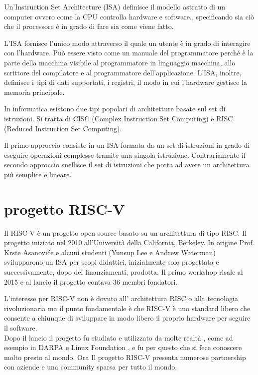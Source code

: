 \documentclass[12pt,a4paper]{report}
\begin{document}
Un'Instruction Set Architecture (ISA) definisce il modello astratto di un computer ovvero come la CPU controlla hardware e software., specificando sia ciò che il processore è in grado di fare sia come viene fatto.

L'ISA fornisce l'unico modo attraverso il quale un utente è in grado di interagire con l'hardware. Può essere visto come un manuale del programmatore perché è la parte della macchina visibile al programmatore in linguaggio macchina,  allo scrittore del compilatore e al programmatore dell'applicazione.
L'ISA, inoltre, definisce i tipi di dati supportati, i registri, il modo in cui l'hardware gestisce la memoria principale. 

In informatica esistono due tipi popolari di architetture basate sul set di istruzioni. Si tratta di CISC (Complex Instruction Set Computing) e RISC (Reduced Instruction Set Computing).


Il primo approccio consiste in un ISA formata da un set di istruzioni in grado di eseguire operazioni complesse tramite una singola istruzione. Contrariamente il secondo approccio snellisce il set di istruzioni che porta ad avere un architettura più semplice e lineare.

\section{progetto RISC-V}
Il RISC-V è un progetto open source basato su un architettura di tipo RISC. Il progetto iniziato nel 2010 all'Università della California, Berkeley. In origine Prof. Krste Asanoviće e alcuni studenti (Yunsup Lee e Andrew Waterman) svilupparono un ISA per scopi didattici, inizialmente solo progettata e successivamente, dopo dei finanziamenti, prodotta. Il primo workshop risale al 2015 e al lancio il progetto contava 36 membri fondatori.

L'interesse per RISC-V non è dovuto all' architettura RISC o alla tecnologia rivoluzionaria ma il punto fondamentale è che RISC-V è uno standard libero che consente a chiunque di sviluppare in modo libero il proprio hardware per seguire il software.\\
Dopo il lancio il progetto fu studiato e utilizzato da molte realtà , come ad esempio in DARPA e Linux Foundation ,  e fu per questo che si fece conoscere molto presto al mondo.  Ora Il progetto RISC-V presenta numerose partnership con aziende e una community sparsa per tutto  il mondo.
\end{document}
